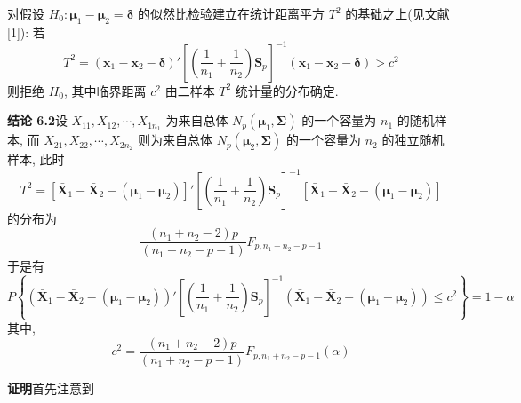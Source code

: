 对假设 $H_{0}: \boldsymbol{\mu}_{1}-\boldsymbol{\mu}_{2}=\boldsymbol{\delta}$ 的似然比检验建立在统计距离平方 $T^{2}$ 的基础之上(见文献[1]): 若
\label{eq:6-23}
\begin{equation}
T^{2}=(\bar{\mathbf{x}}_{1}-\bar{\mathbf{x}}_{2}-\boldsymbol{\delta})'\left[\left(\frac{1}{n_{1}}+\frac{1}{n_{2}}\right)\mathbf{S}_{p}\right]^{-1}(\bar{\mathbf{x}}_{1}-\bar{\mathbf{x}}_{2}-\boldsymbol{\delta})>c^{2}
\tag{6-23}
\end{equation}
则拒绝 $H_{0}$, 其中临界距离 $c^{2}$ 由二样本 $T^{2}$ 统计量的分布确定.

\noindent\textbf{结论 6.2}\quad 设 $X_{11},X_{12},\cdots,X_{1n_{1}}$ 为来自总体 $N_{p}(\boldsymbol{\mu}_{1},\boldsymbol{\Sigma})$ 的一个容量为 $n_{1}$ 的随机样本, 而 $X_{21},X_{22},\cdots,X_{2n_{2}}$ 则为来自总体 $N_{p}(\boldsymbol{\mu}_{2},\boldsymbol{\Sigma})$ 的一个容量为 $n_{2}$ 的独立随机样本, 此时
\[
T^{2}=[\bar{\mathbf{X}}_{1}-\bar{\mathbf{X}}_{2}-(\boldsymbol{\mu}_{1}-\boldsymbol{\mu}_{2})]'\left[\left(\frac{1}{n_{1}}+\frac{1}{n_{2}}\right)\mathbf{S}_{p}\right]^{-1}[\bar{\mathbf{X}}_{1}-\bar{\mathbf{X}}_{2}-(\boldsymbol{\mu}_{1}-\boldsymbol{\mu}_{2})]
\]
的分布为
\[
\frac{(n_{1}+n_{2}-2)p}{(n_{1}+n_{2}-p-1)}F_{p,n_{1}+n_{2}-p-1}
\]
于是有
\label{eq:6-24}
\begin{equation}
P\left\{(\bar{\mathbf{X}}_{1}-\bar{\mathbf{X}}_{2}-(\boldsymbol{\mu}_{1}-\boldsymbol{\mu}_{2}))'\left[\left(\frac{1}{n_{1}}+\frac{1}{n_{2}}\right)\mathbf{S}_{p}\right]^{-1}(\bar{\mathbf{X}}_{1}-\bar{\mathbf{X}}_{2}-(\boldsymbol{\mu}_{1}-\boldsymbol{\mu}_{2}))\le c^{2}\right\}=1-\alpha
\tag{6-24}
\end{equation}
其中,
\[
c^{2}=\frac{(n_{1}+n_{2}-2)p}{(n_{1}+n_{2}-p-1)}F_{p,n_{1}+n_{2}-p-1}(\alpha)
\]

\noindent\textbf{证明}\quad 首先注意到
